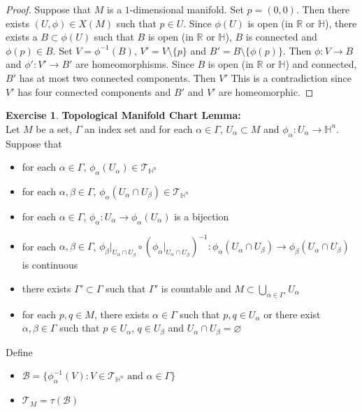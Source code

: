 \documentclass{book}
\theoremstyle{definition}
\newtheorem{ex}[definition]{Exercise}
\newcommand{\al}{\alpha}
\newcommand{\be}{\beta}
\newcommand{\Gam}{\Gamma}
\renewcommand{\H}{\mathbb{H}}
\newcommand{\R}{\mathbb{R}}
\newcommand{\MB}{\mathcal{B}}
\newcommand{\MT}{\mathcal{T}}
\DeclareMathOperator*{\0}{\mbf{0}}
\DeclareMathOperator*{\1}{\mbf{1}}
\newcommand{\tbf}[1]{\textbf{#1}}
\begin{document}
	\begin{proof}
		Suppose that $M$ is a $1$-dimensional manifold. Set $p = (0,0)$. Then there exists $(U, \phi) \in X(M)$ such that $p \in U$. Since $\phi(U)$ is open (in $\R$ or $\H$), there exists a $B \subset \phi(U)$ such that $B$ is open (in $\R$ or $\H$), $B$ is connected and $\phi(p) \in B$. Set $V = \phi^{-1}(B)$, $V' = V \setminus \{p\}$ and $B' = B \setminus \{\phi(p)\}$. Then $\phi: V \rightarrow B$ and $\phi': V' \rightarrow B'$ are homeomorphisms. Since $B$ is open (in $\R$ or $\H$) and connected, $B'$ has at most two connected components. Then $V'$ This is a contradiction since $V'$ has four connected components and $B'$ and $V'$ are homeomorphic. 
	\end{proof}



	\begin{ex} \tbf{Topological Manifold Chart Lemma:} \\
	Let $M$ be a set, $\Gam$ an index set and for each $\al \in \Gam$, $U_{\al} \subset M$ and $\phi_{\al}: U_{\al} \rightarrow \H^n$. Suppose that 
	\begin{itemize}
		\item for each $\al \in \Gam$, $\phi_{\al}(U_{\al}) \in \MT_{\H^n}$ 
		\item for each $\al, \be \in \Gam$, $\phi_{\al}(U_{\al} \cap U_{\be}) \in \MT_{\H^n}$
		\item for each $\al \in \Gam$, $\phi_{\al}: U_{\al} \rightarrow \phi_{\al}(U_{\al})$ is a bijection
		\item for each $\al, \be \in \Gam$, $\phi_{\be}|_{U_{\al} \cap U_{\be}} \circ (\phi_{\al}|_{U_{\al} \cap U_{\be}})^{-1}: \phi_{\al}(U_{\al} \cap U_{\be}) \rightarrow \phi_{\be}(U_{\al} \cap U_{\be})$ is continuous
		\item there exists $\Gam' \subset \Gam$ such that $\Gam'$ is countable and $M \subset \bigcup\limits_{\al \in \Gam'} U_{\al}$
		\item for each $p,q \in M$, there exists $\al \in \Gam$ such that $p,q \in U_{\al}$ or there exist $\al,\be \in \Gam$ such that $p \in U_{\al}$, $q \in U_{\be}$ and $U_{\al} \cap U_{\be} = \varnothing$
	\end{itemize}
	Define 
	\begin{itemize}
		\item $\MB = \{\phi_{\al}^{-1}(V): V \in \MT_{\H^n} \text{ and $\al \in \Gam$} \}$
		\item $\MT_M = \tau(\MB)$
	\end{itemize}

\end{ex}
\end{document}
